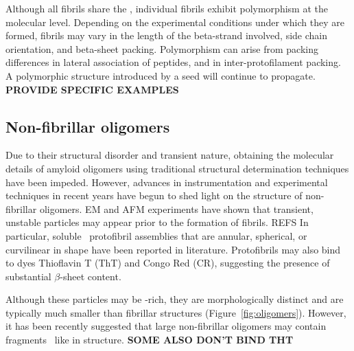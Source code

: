 Although all fibrils share the \crossbs, individual fibrils exhibit polymorphism at the molecular level. Depending on the experimental conditions under which they are formed, fibrils may vary in the length of the beta-strand involved, side chain orientation, and beta-sheet packing.\cite{Kodali:2007cz}
Polymorphism can arise from packing differences in lateral association of peptides, and in inter-protofilament packing. A polymorphic structure introduced by a seed will continue to propagate.\cite{some new papers,petkova polymorphism in Abeta} %
\textbf{PROVIDE SPECIFIC EXAMPLES}

\subsection{Non-fibrillar oligomers}

Due to their structural disorder and transient nature, obtaining the molecular details of amyloid oligomers using traditional structural determination techniques have been impeded. However, advances in instrumentation and experimental techniques in recent years have begun to shed light on the structure of non-fibrillar oligomers. EM and AFM experiments have shown that transient, unstable particles may appear prior to the formation of fibrils. REFS
In particular, soluble \abeta\ protofibril assemblies that are annular, spherical, or curvilinear in shape have been reported in literature.\cite{Haass:2007db} Protofibrils may also bind to dyes Thioflavin T (ThT) and Congo Red (CR), suggesting the presence of substantial $\beta$-sheet content.\cite{Walsh:2007fu,Haass:2007db,Kodali:2007cz} 

Although these particles may be \bsheet-rich, they are morphologically distinct and are typically much smaller than fibrillar structures (Figure~\ref{fig:oligomers}).\cite{Walsh:2009p1235} However, it has been recently suggested that large non-fibrillar oligomers may contain fragments \crossb\ like in structure.\cite{Walsh:2010p4761,Stroud:2012dp,Chimon:2007du}  
\textbf{SOME ALSO DON'T BIND THT}


